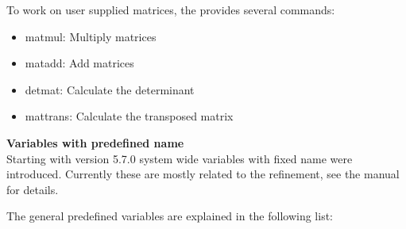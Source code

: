 To work on user supplied matrices, the \Suite provides several commands:
\begin{itemize}
  \item matmul: Multiply matrices
  \item matadd: Add      matrices
  \item detmat: Calculate the determinant
  \item mattrans: Calculate the transposed matrix
\end{itemize}
%
\par

{\bf Variables with predefined name }\\

Starting with version 5.7.0 system wide variables with fixed name 
were introduced. Currently these are mostly related to the refinement,
see the \Diffev manual for details. 

The general predefined variables are explained in the following list:


